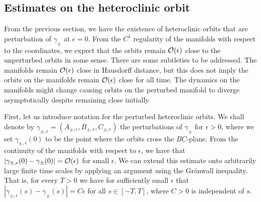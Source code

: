 \subsection{Estimates on the heteroclinic orbit}

From the previous section, we have the existence of heteroclinic orbits that are perturbation of \(\gamma_\pm\) at \(\epsilon = 0\). From the \(C^1\) regularity of the manifolds with respect to the coordinates, we expect that the orbits remain \(\mathcal{O}(\epsilon)\) close to the unperturbed orbits in some sense. There are some subtleties to be addressed. The manifolds remain \(\mathcal{O}(\epsilon)\) close in Hausdorff distance, but this does not imply the orbits on the manifolds remain \(\mathcal{O}(\epsilon)\) close for all time. The dynamics on the manifolds might change causing orbits on the perturbed manifold to diverge asymptotically despite remaining close initially.

First, let us introduce notation for the perturbed heteroclinic orbits. We shall denote by \(\gamma_{\pm, \epsilon} = (A_{\pm, \epsilon} , B_{\pm, \epsilon}, C_{\pm,\epsilon})\) the perturbations of \(\gamma_{\pm}\) for \(\epsilon > 0\), where we set \(\gamma_{\pm,\epsilon}(0)\) to be the point where the orbits cross the \(\underline{B}\underline{C}\)-plane. From the continuity of the manifolds with respect to \(\epsilon\), we have that \(|\gamma_{\pm, \epsilon}(0) - \gamma_\pm(0)| = \mathcal{O}(\epsilon)\) for small \(\epsilon\). We can extend this estimate onto arbitrarily large finite time scales by applying an argument using the Gr\"onwall inequality. That is, for every \(T> 0\) we have for sufficiently small \(\epsilon\) that \(|\gamma_{\pm, \epsilon}(s) - \gamma_\pm(s)| = C\epsilon\) for all \(s\in[-T,T]\), where \(C>0\) is independent of \(s\). 

